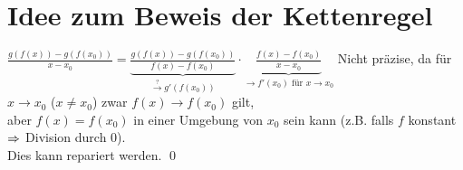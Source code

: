 \section*{Idee zum Beweis der Kettenregel}
$\frac{g(f(x)) - g(f(x_0))}{x-x_0} = \underbrace{\frac{g(f(x))-g(f(x_0))}{f(x)-f(x_0)}}_{\overset{\text{?}}{\to} g'(f(x_0))} \cdot \underbrace{\frac{f(x)-f(x_0)}{x-x_0}}_{\to f'(x_0) \text{ für } x \to x_0}$\nl
Nicht präzise, da für $x \to x_0$ ($x \neq x_0$) zwar $f(x) \to f(x_0)$ gilt,\\
aber $f(x)=f(x_0)$ in einer Umgebung von $x_0$ sein kann (z.B. falls $f$ konstant $\Rightarrow$ Division durch $0$).\\
Dies kann repariert werden. \qed
